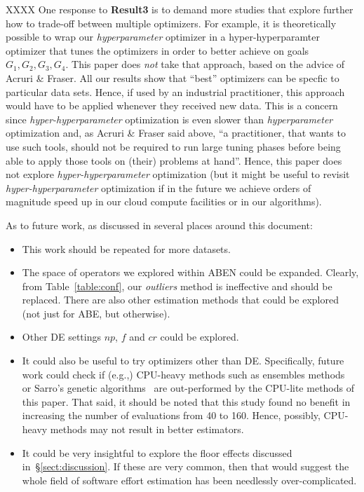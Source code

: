 \documentclass[10pt,conference]{IEEEtran}
\newcommand{\bi}{\begin{itemize}}
\newcommand{\ei}{\end{itemize}}
\newcommand{\tion}[1]{\S\ref{sect:#1}}
\begin{document}
XXXX 
One response to {\bf Result3} is to demand more studies that explore
further how to trade-off between multiple optimizers.
For example, it is theoretically possible to wrap
our {\em hyperparameter} optimizer in a hyper-hyperparamter optimizer
that tunes the optimizers in order to better achieve on goals $G_1,G_2,G_3,G_4$.  This paper does {\em not} take that approach,
based on the advice of Acruri \& Fraser. All our results show
that ``best'' optimizers can be specfic to particular data sets. Hence, if used by
an industrial practitioner, this approach would have to be applied
whenever they received new data. This is a concern
since {\em hyper-hyperparameter} optimization is even slower than
{\em hyperparameter} optimization and, as Acruri \& Fraser said above,
``a practitioner, that wants to use such tools, should not be required to run large tuning phases before being able to apply those tools on (their) problems at hand''. Hence, this paper does not explore {\em hyper-hyperparameter}
optimization (but it might be useful to revisit
{\em hyper-hyperparameter} optimization  if in the future we  achieve orders of magnitude speed up in our cloud 
compute facilities or in our algorithms).





As to future work, as  discussed in several places around this document:
\bi
\item This work should be repeated for  more     datasets. 
\item The space of operators we explored within ABEN could be expanded. Clearly, from Table~\ref{table:conf}, our {\em outliers} method is ineffective and
should be replaced. There are also other  estimation methods that could be explored (not just  for ABE, but otherwise).
\item
Other DE settings  $\mathit{np}$, $\mathit{f}$ and $\mathit{cr}$ could be explored.
\item
It could also be useful to try optimizers other than DE.
Specifically, future work could check  if (e.g.,) CPU-heavy methods such as ensembles methods~\cite{Kocaguneli:2012} or Sarro's genetic algorithms~\cite{sarro2016multi} 
are out-performed by the CPU-lite methods of this paper. That said, it should be noted that this study found no benefit in increasing the number of evaluations from  40 to 160.  Hence, possibly,  CPU-heavy
methods may not result in better estimators.
\item
It could be very insightful to explore the floor effects discussed in~\tion{discussion}. If these are very common, then that would
suggest the whole field of software effort estimation has been needlessly over-complicated.
\ei


 
%
%

  
\tiny


 
%
\end{document}

